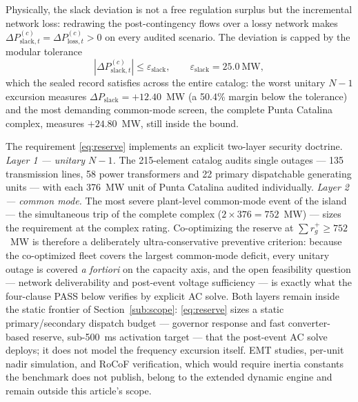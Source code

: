 Physically, the slack deviation is not a free regulation surplus but the incremental network loss: redrawing the post-contingency flows over a lossy network makes $\Delta P_{\mathrm{slack},t}^{(c)} = \Delta P_{\mathrm{loss},t}^{(c)} > 0$ on every audited scenario. The deviation is capped by the modular tolerance
\begin{equation}
|\Delta P_{\mathrm{slack},t}^{(c)}| \le \varepsilon_{\mathrm{slack}}, \qquad \varepsilon_{\mathrm{slack}} = 25.0~\mathrm{MW},
\label{eq:slacktol}
\end{equation}
which the sealed record satisfies across the entire catalog: the worst unitary $N-1$ excursion measures $\Delta P_{\mathrm{slack}} = +12.40$~MW (a 50.4\% margin below the tolerance) and the most demanding common-mode screen, the complete Punta Catalina complex, measures $+24.80$~MW, still inside the bound.

The requirement \eqref{eq:reserve} implements an explicit two-layer security doctrine. \emph{Layer 1 --- unitary $N-1$.} The 215-element catalog audits single outages --- 135 transmission lines, 58 power transformers and 22 primary dispatchable generating units --- with each 376~MW unit of Punta Catalina audited individually. \emph{Layer 2 --- common mode.} The most severe plant-level common-mode event of the island --- the simultaneous trip of the complete complex ($2 \times 376 = 752$~MW) --- sizes the requirement at the complex rating. Co-optimizing the reserve at $\sum r_g^+ \ge 752$~MW is therefore a deliberately ultra-conservative preventive criterion: because the co-optimized fleet covers the largest common-mode deficit, every unitary outage is covered \emph{a fortiori} on the capacity axis, and the open feasibility question --- network deliverability and post-event voltage sufficiency --- is exactly what the four-clause PASS below verifies by explicit AC solve. Both layers remain inside the static frontier of Section~\ref{sub:scope}: \eqref{eq:reserve} sizes a static primary/secondary dispatch budget --- governor response and fast converter-based reserve, sub-500~ms activation target --- that the post-event AC solve deploys; it does not model the frequency excursion itself. EMT studies, per-unit nadir simulation, and RoCoF verification, which would require inertia constants the benchmark does not publish, belong to the extended dynamic engine and remain outside this article's scope.

